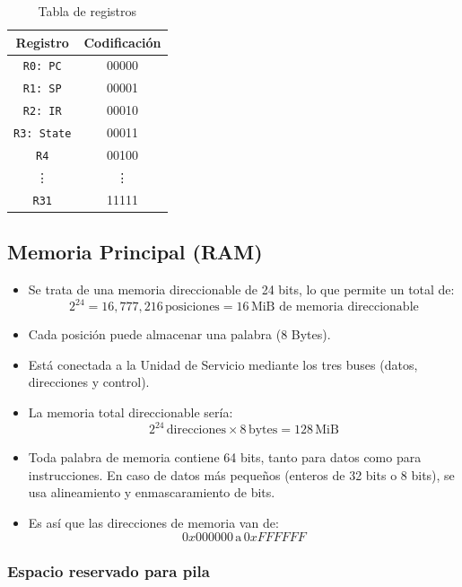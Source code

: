 \documentclass{article}
\begin{document}
\begin{table}[H]
    \centering
    \begin{tabular}{|c|c|}
    \hline
    \textbf{Registro} & \textbf{Codificación} \\
    \hline
    \texttt{R0: PC} & 00000 \\
    \texttt{R1: SP} & 00001 \\
    \texttt{R2: IR} & 00010 \\
    \texttt{R3: State} & 00011 \\
    \texttt{R4} & 00100 \\
    \vdots & \vdots \\
    \texttt{R31} & 11111 \\
    \hline
    \end{tabular}
    \caption{Tabla de registros}
\end{table}

\subsection{Memoria Principal (RAM)}

\begin{itemize}
    \item Se trata de una memoria direccionable de 24 bits, lo que permite un total de:
    \[
    2^{24} = 16,777,216 \, \text{posiciones} = 16 \, \text{MiB de memoria direccionable}
    \]
    \item Cada posición puede almacenar una palabra (8 Bytes).
    \item Está conectada a la Unidad de Servicio mediante los tres buses (datos, direcciones y control).
    \item La memoria total direccionable sería:
    \[
    2^{24} \, \text{direcciones} \times 8 \, \text{bytes} = 128 \, \text{MiB}
    \]
    \item Toda palabra de memoria contiene 64 bits, tanto para datos como para instrucciones. En caso de datos más pequeños (enteros de 32 bits o 8 bits), se usa alineamiento y enmascaramiento de bits.
    \item Es así que las direcciones de memoria van de:
    \[
    0x000000 \, \text{a} \, 0xFFFFFF
    \]
\end{itemize}

\subsubsection{Espacio reservado para pila}
\end{document}
